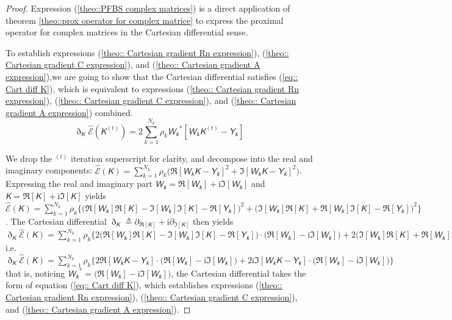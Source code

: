 \documentclass{article}
\newcommand{\mat}[1]{\bm{\mathsfit{#1}}}
\begin{document}
\begin{proof} 
Expression (\ref{theo::PFBS complex matrices}) is a direct application of theorem \ref{theo::prox operator for complex matrice} to express the proximal operator for complex matrices in the Cartesian differential sense.

To establish expressions (\ref{theo:: Cartesian gradient Rn expression}), (\ref{theo:: Cartesian gradient C expression}), and (\ref{theo:: Cartesian gradient A expression}),we are going to show that the Cartesian differential satisfies (\ref{eq:: Cart diff K}), which is equivalent to expressions (\ref{theo:: Cartesian gradient Rn expression}), (\ref{theo:: Cartesian gradient C expression}), and (\ref{theo:: Cartesian gradient A expression}) combined. 
\begin{equation}
  \eth_{\mat{K}}\widehat{\mathcal{E}}\left(\mat{K}^{(t)} \right) = 2 \sum_{k=1}^{N_k} \rho_k \mat{W_k}^* \left[ \mat{W_k}  \mat{K}^{(t)} - \mat{Y_k}  \right]
  \label{eq:: Cart diff K}
\end{equation}

We drop the $^{(t)}$ iteration superscript for clarity, and decompose into the real and imaginary components:
$ \widehat{\mathcal{E}}\left(\mat{K} \right) = \sum_{k=1}^{N_k} \rho_k \Big( \Re[\mat{W_k}  \mat{K} - \mat{Y_k} ]^2 + \Im[\mat{W_k}  \mat{K} - \mat{Y_k} ]^2  \Big)$. Expressing the real and imaginary part $ \mat{W_k} = \Re[\mat{W_k}] + \mathrm{i} \Im[ \mat{W_k}]$ and $ \mat{K} = \Re[\mat{K}] + \mathrm{i} \Im[ \mat{K}]$ yields $ \widehat{\mathcal{E}}\left(\mat{K} \right) = \sum_{k=1}^{N_k} \rho_k \Bigg\{ \Big(  \Re[\mat{W_k}] \Re[\mat{K}] - \Im[\mat{W_k}]\Im[\mat{K}] - \Re[\mat{Y_k}]  \Big)^2 + \Big(  \Im[\mat{W_k}] \Re[\mat{K}] + \Re[\mat{W_k}]\Im[\mat{K}] - \Re[\mat{Y_k}]  \Big)^2  \Bigg\}$.
The Cartesian differential $\eth_{\mat{K}} \triangleq \partial_{\Re[\mat{K}]} + \mathrm{i} \partial_{\Im[\mat{K}]}$ then yields $ \eth_{\mat{K}}\widehat{\mathcal{E}}\left(\mat{K} \right) = \sum_{k=1}^{N_k} \rho_k \Bigg\{ 2 \Big(  \Re[\mat{W_k}] \Re[\mat{K}] - \Im[\mat{W_k}]\Im[\mat{K}] - \Re[\mat{Y_k}]  \Big) \cdot \Big( \Re[\mat{W_k}]  - \mathrm{i} \Im[\mat{W_k}] \Big) + 2 \Big(  \Im[\mat{W_k}] \Re[\mat{K}] + \Re[\mat{W_k}]\Im[\mat{K}] - \Re[\mat{Y_k}]  \Big)\cdot \Big( \Im[\mat{W_k}]  + \mathrm{i} \Re[\mat{W_k}] \Big)  \Bigg\}$ i.e. $ \eth_{\mat{K}}\widehat{\mathcal{E}}\left(\mat{K} \right) = \sum_{k=1}^{N_k} \rho_k \Bigg\{ 2 \Re[\mat{W_k}  \mat{K} - \mat{Y_k} ] \cdot \Big( \Re[\mat{W_k}]  - \mathrm{i} \Im[\mat{W_k}] \Big) + 2\mathrm{i} \Im[\mat{W_k}  \mat{K} - \mat{Y_k} ] \cdot \Big( \Re[\mat{W_k}] - \mathrm{i} \Im[\mat{W_k}] \Big)  \Bigg\}$ that is, noticing $\mat{W_k}^* = \Big( \Re[\mat{W_k}] - \mathrm{i} \Im[\mat{W_k}] \Big)$, the Cartesian differential takes the form of equation (\ref{eq:: Cart diff K}), which establishes expressions (\ref{theo:: Cartesian gradient Rn expression}), (\ref{theo:: Cartesian gradient C expression}), and (\ref{theo:: Cartesian gradient A expression}). 


\end{proof}
\end{document}
